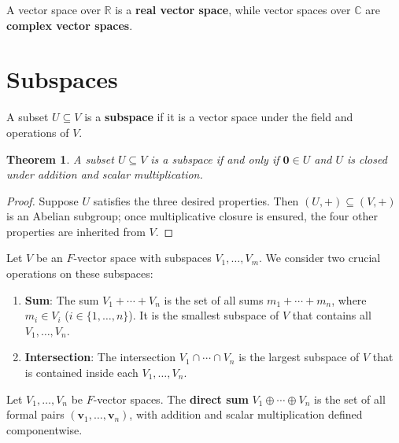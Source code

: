 \documentclass[11pt]{article}
\newtheorem{theorem}{Theorem}
\renewcommand{\vec}[1]{\mathbf{#1}}
\begin{document}
A vector space over $\mathbb{R}$ is a \textbf{real vector space}, while vector spaces over $\mathbb{C}$ are \textbf{complex vector spaces}.


\section{Subspaces}

A subset $U \subseteq V$ is a \textbf{subspace} if it is a vector space under the field and operations of $V$.

\begin{adjustwidth}{0.5cm}{}
  \begin{theorem}
    A subset $U \subseteq V$ is a subspace if and only if $\vec{0} \in U$ and $U$ is closed under addition and scalar multiplication.
  \end{theorem}
  \begin{proof}
    Suppose $U$ satisfies the three desired properties. Then $(U, +) \subseteq (V, +)$ is an Abelian subgroup; once multiplicative closure is ensured, the four other properties are inherited from $V$.
  \end{proof}
\end{adjustwidth}

Let $V$ be an $F$-vector space with subspaces $V_{1}, \ldots, V_{m}$. We consider two crucial operations on these subspaces: 

\begin{enumerate}
	\item \textbf{Sum}: The sum $V_{1} + \cdots + V_{n}$ is the set of all sums $m_{1} + \cdots + m_{n}$, where $m_{i} \in V_{i}$ ($i \in \{ 1, \ldots, n \}$). It is the smallest subspace of $V$ that contains all $V_{1}, \ldots, V_{n}$.
	\item \textbf{Intersection}: The intersection $V_{1} \cap \cdots \cap V_{n}$ is the largest subspace of $V$ that is contained inside each $V_{1}, \ldots, V_{n}$.
\end{enumerate}

Let $V_{1}, \ldots, V_{n}$ be $F$-vector spaces. The \textbf{direct sum} $V_{1} \oplus \cdots \oplus V_{n}$ is the set of all formal pairs $(\vec{v}_{1}, \ldots, \vec{v}_{n})$, with addition and scalar multiplication defined componentwise.
\end{document}
